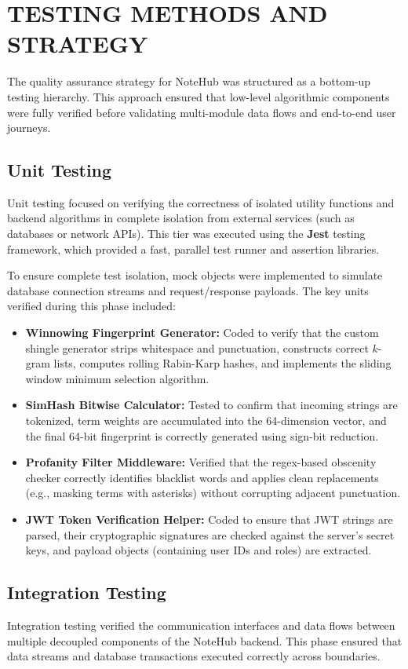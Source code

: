 \documentclass[12,Times new Roman,a4paper]{report}
\begin{document}
\section{TESTING METHODS AND STRATEGY}

The quality assurance strategy for NoteHub was structured as a bottom-up testing hierarchy. This approach ensured that low-level algorithmic components were fully verified before validating multi-module data flows and end-to-end user journeys.

\subsection{Unit Testing}
Unit testing focused on verifying the correctness of isolated utility functions and backend algorithms in complete isolation from external services (such as databases or network APIs). This tier was executed using the \textbf{Jest} testing framework, which provided a fast, parallel test runner and assertion libraries. 

To ensure complete test isolation, mock objects were implemented to simulate database connection streams and request/response payloads. The key units verified during this phase included:
\begin{itemize}
    \item \textbf{Winnowing Fingerprint Generator:} Coded to verify that the custom shingle generator strips whitespace and punctuation, constructs correct $k$-gram lists, computes rolling Rabin-Karp hashes, and implements the sliding window minimum selection algorithm.
    \item \textbf{SimHash Bitwise Calculator:} Tested to confirm that incoming strings are tokenized, term weights are accumulated into the 64-dimension vector, and the final 64-bit fingerprint is correctly generated using sign-bit reduction.
    \item \textbf{Profanity Filter Middleware:} Verified that the regex-based obscenity checker correctly identifies blacklist words and applies clean replacements (e.g., masking terms with asterisks) without corrupting adjacent punctuation.
    \item \textbf{JWT Token Verification Helper:} Coded to ensure that JWT strings are parsed, their cryptographic signatures are checked against the server's secret keys, and payload objects (containing user IDs and roles) are extracted.
\end{itemize}

\subsection{Integration Testing}
Integration testing verified the communication interfaces and data flows between multiple decoupled components of the NoteHub backend. This phase ensured that data streams and database transactions executed correctly across boundaries.
\end{document}
